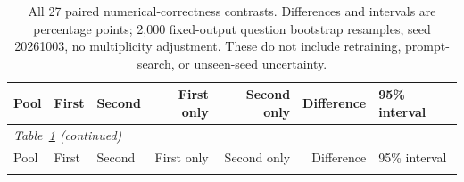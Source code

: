 \documentclass[journal,onecolumn]{IEEEtran}
\begin{document}
\normalsize


\scriptsize\setlength{\tabcolsep}{4pt}

\begin{longtable}{@{}lllrrrl@{}}
\caption{All 27 paired numerical-correctness contrasts. Differences and intervals are percentage points; 2,000 fixed-output question bootstrap resamples, seed 20261003, no multiplicity adjustment. These do not include retraining, prompt-search, or unseen-seed uncertainty.}\label{tab:extension-paired}\\
\toprule
Pool & First & Second & First only & Second only & Difference & 95\% interval\\\midrule
\endfirsthead
\multicolumn{6}{l}{\textit{Table~\ref{tab:extension-paired} (continued)}}\\
\toprule
Pool & First & Second & First only & Second only & Difference & 95\% interval\\\midrule
\endhead
\bottomrule\endfoot


\end{longtable}
\end{document}
